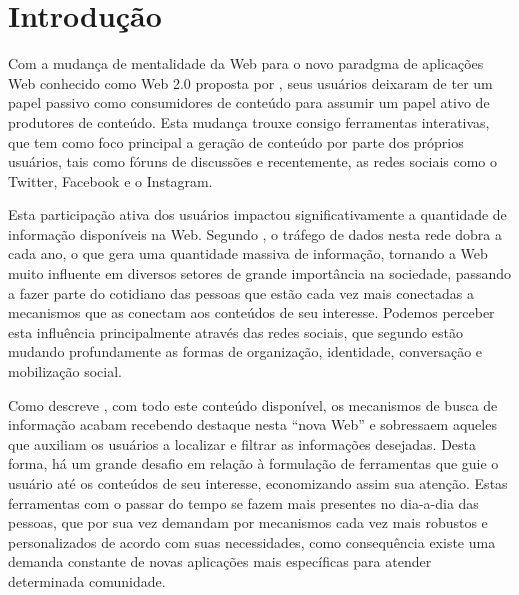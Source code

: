 \section{\esp Introdução}
Com a mudança de mentalidade da Web para o novo paradgma de aplicações Web conhecido como Web 2.0 proposta por \cite{web20Proposta}, seus 
usuários deixaram de ter um papel passivo como consumidores de conteúdo para assumir um papel ativo de produtores de conteúdo. Esta mudança 
trouxe consigo ferramentas interativas, que tem como foco principal a geração de conteúdo por parte dos próprios usuários, tais como fóruns 
de discussões e recentemente, as redes sociais como o Twitter, Facebook e o Instagram.

Esta participação ativa dos usuários impactou significativamente a quantidade de informação disponíveis na Web. Segundo \cite{artigo01}, 
o tráfego de dados nesta rede dobra a cada ano, o que gera uma quantidade massiva de informação, tornando a Web muito influente em diversos 
setores de grande importância na sociedade, passando a fazer parte do cotidiano das pessoas que estão cada vez mais conectadas a mecanismos que
as  conectam aos conteúdos de seu interesse. Podemos perceber esta influência principalmente através das redes sociais, que segundo 
\cite{redesSociais01} estão mudando profundamente as formas de organização, identidade, conversação e mobilização social.

Como descreve \cite{deitelAjax}, com todo este conteúdo disponível, os mecanismos de busca de informação 
acabam recebendo destaque nesta ``nova Web'' e sobressaem aqueles que auxiliam os usuários  a localizar e filtrar 
as informações desejadas. Desta forma, há um grande desafio em relação à formulação de ferramentas que guie o usuário até os conteúdos de seu 
interesse, economizando assim sua atenção. Estas ferramentas com o passar do tempo se fazem mais presentes no dia-a-dia das pessoas, 
que por sua vez demandam por mecanismos cada vez mais robustos e personalizados de acordo com suas necessidades, como consequência existe 
uma demanda constante de novas aplicações mais específicas para atender determinada comunidade.

